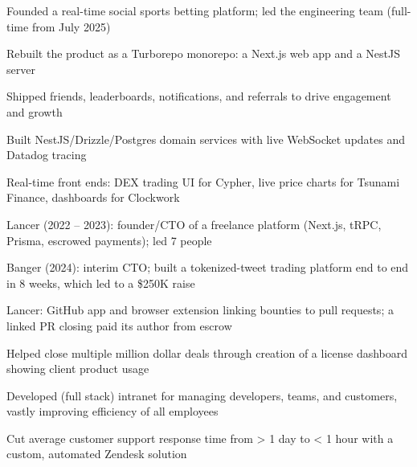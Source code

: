\documentclass[print]{jack-resume}
\begin{document}
\begin{tightemize}
    \item Founded a real-time social sports betting platform; led the engineering team (full-time from July 2025)
    \item Rebuilt the product as a Turborepo monorepo: a Next.js web app and a NestJS server
    \item Shipped friends, leaderboards, notifications, and referrals to drive engagement and growth
    \item Built NestJS/Drizzle/Postgres domain services with live WebSocket updates and Datadog tracing
\end{tightemize}
\sectionsep

\begin{tightemize}
    \item Real-time front ends: DEX trading UI for Cypher, live price charts for Tsunami Finance, dashboards for Clockwork
    \item Lancer (2022 -- 2023): founder/CTO of a freelance platform (Next.js, tRPC, Prisma, escrowed payments); led 7 people
    \item Banger (2024): interim CTO; built a tokenized-tweet trading platform end to end in 8 weeks, which led to a \$250K raise
    \item Lancer: GitHub app and browser extension linking bounties to pull requests; a linked PR closing paid its author from escrow
\end{tightemize}
\sectionsep

\begin{tightemize}
    \item Helped close multiple million dollar deals through creation of a license dashboard showing client product usage
    \item Developed (full stack) intranet for managing developers, teams, and customers, vastly improving efficiency of all employees
    \item Cut average customer support response time from > 1 day to < 1 hour with a custom, automated Zendesk solution
\end{tightemize}
\sectionsep
\end{document}
